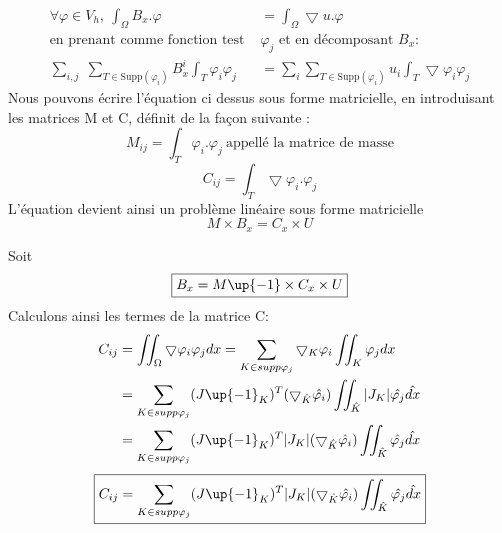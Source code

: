 \documentclass[a4paper,12pt,titlepage]{report}
\begin{document}
\begin{onehalfspace}
\[
\begin{aligned}
		\forall \varphi \in V_{h} , \ \int_{\Omega}B_x.  \varphi &= \int_{\Omega}\bigtriangledown u .\varphi  \\
		\text{en prenant comme fonction test }&\varphi_j \text{ et en décomposant }B_x : \\
		\sum_{i,j}\;  \sum_{T \in \text{Supp}(\varphi_{i})}B_{x}^{i}\int_{T} \varphi_i\varphi_j & =  \sum_{i}  \sum_{T \in \text{Supp}(\varphi_{i})} u_i \int_{T}\bigtriangledown\varphi_i\varphi_j  
\end{aligned}
\]
Nous pouvons écrire l'équation ci dessus sous forme matricielle, en introduisant les matrices M et C, définit de la façon suivante :
\[
		M_{ij}=\int_{T} \varphi_i.\varphi_j \ \text{appellé la matrice de masse}
\]
\[
		C_{ij}=\int_{T} \bigtriangledown\varphi_i.\varphi_j 
\]
L'équation devient ainsi un problème linéaire sous forme matricielle  
\[
	M \times B_x=C_x \times U
\] 

Soit 
\[
	\boxed{B_x =M\up{-1}\times C_x \times U}
\]
Calculons ainsi les termes de la matrice C:
\[
\begin{aligned}
C_{ij} &= \iint_{\Omega}\bigtriangledown\varphi_i\varphi_j dx      
       = \sum_{K\in supp\varphi_j}\bigtriangledown_K\varphi_i \iint_{K} \varphi_jdx \\
	 &= \sum_{K\in supp\varphi_j}(J\up{-1}_K)^{T}(\bigtriangledown_{\hat{K}} \hat{\varphi_i})\iint_{\hat{K}}  |J_{K}| \hat{\varphi_j}\hat{dx} \\
	&= \sum_{K\in supp\varphi_j}(J\up{-1}_K)^{T}|J_K| (\bigtriangledown_{\hat{K} }\hat{\varphi_i})\iint_{\hat{K}}  \hat{\varphi_j}\hat{dx}
\end{aligned}
\]
\[\boxed{C_{ij} =  \sum_{K\in supp\varphi_j}(J\up{-1}_K)^{T}|J_K| (\bigtriangledown_{\hat{K} }\hat{\varphi_i})\iint_{\hat{K}}  \hat{\varphi_j}\hat{dx}} \]


\end{onehalfspace}
\end{document}
